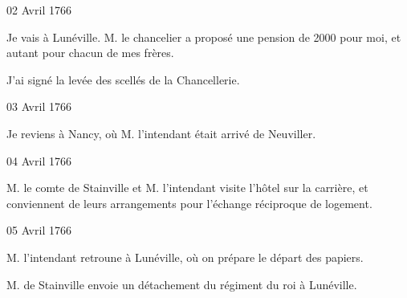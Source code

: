                      \begin{diary}{02 Avril 1766}{}
                        
                         Je vais à Lunéville. M. le
                              chancelier
                           a proposé une pension de 2000 pour
                           moi, et autant pour chacun de mes frères. \bigskip
        
        
                         J'ai signé la levée des scellés de
                              la Chancellerie. \bigskip
        
        
                     \end{diary}

                     \begin{diary}{03 Avril 1766}{}
                        
                         Je reviens à Nancy, où M.
                              l'intendant
                           était arrivé de Neuviller. \bigskip
        
        
                     \end{diary}

                     \begin{diary}{04 Avril 1766}{}
                        
                        
                           M. le comte de Stainville et
                              M. l'intendant
                           visite l'hôtel sur la
                              carrière, et conviennent
                           de leurs arrangements pour l'échange
                           réciproque de logement. \bigskip
        
        
                     \end{diary}

                     \begin{diary}{05 Avril 1766}{}
                        
                        
                           M. l'intendant retroune à
                              Lunéville, où
                           on prépare le départ des papiers. \bigskip
        
        
                        
                           M. de Stainville
                           envoie un détachement du régiment du roi à Lunéville. \bigskip
        
        
                     \end{diary}

